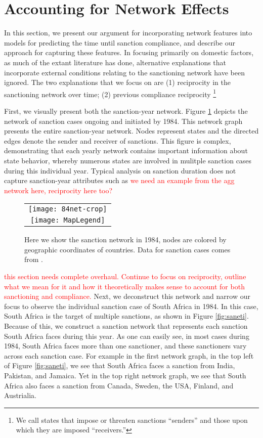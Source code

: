 \section*{Accounting for Network Effects}
\label{neteffects}

In this section, we present our argument for incorporating network features into models for predicting the time until sanction compliance, and describe our approach for capturing these features. In focusing primarily on domestic factors, as much of the extant literature has done, alternative explanations that incorporate external conditions relating to the sanctioning network have been ignored. The two explanations that we focus on are (1) reciprocity in the sanctioning network over time; (2) previous compliance reciprocity \footnote{We call states that impose or threaten sanctions “senders” and those upon which they are imposed “receivers.”}

First, we visually present both the sanction-year network. Figure \ref{fig:spaghetti} depicts the network of sanction cases ongoing and initiated by 1984. This network graph presents the entire sanction-year network.  Nodes represent states and the directed edges denote the sender and receiver of sanctions. This figure is complex, demonstrating that each yearly network contains important information about state behavior, whereby numerous states are involved in mulitple sanction cases during this individual year. Typical analysis on sanction duration does not capture sanction-year attributes such as \textcolor{red}{we need an example from the agg network here, reciprocity here too?}

\begin{figure}[ht]
  \centering
  \begin{tabular}{c}
	  \texttt{[image: 84net-crop]} \\
	  \texttt{[image: MapLegend]}
  \end{tabular}
  \caption{Here we show the sanction network in 1984, nodes are colored by geographic coordinates of countries. Data for sanction cases comes from \citet{morgan2009threat}.}
  \label{fig:spaghetti}
\end{figure}
\FloatBarrier

\textcolor{red}{this section needs complete overhaul. Continue to focus on reciprocity, outline what we mean for it and how it theoretically makes sense to account for both sanctioning and compliance.}
Next, we deconstruct this network and narrow our focus to observe the individual sanction case of South Africa in 1984. In this case, South Africa is the target of multiple sanctions, as shown in Figure \ref{fig:saneti}. Because of this, we construct a sanction network that represents each sanction South Africa faces during this year. As one can easily see, in most cases during 1984, South Africa faces more than one sanctioner, and these sanctioners vary across each sanction case. For example in the first network graph, in the top left of Figure \ref{fig:saneti}, we see that South Africa faces a sanction from India, Pakistan, and Jamaica. Yet in the top right network graph, we see that South Africa also faces a sanction from Canada, Sweden, the USA, Finland, and Austrialia. 

